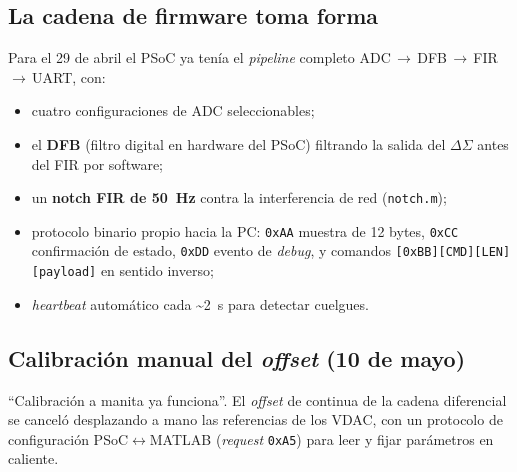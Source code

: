 \subsection{La cadena de firmware toma forma}

Para el 29 de abril el PSoC ya ten\'ia el \emph{pipeline} completo
ADC\,$\to$\,DFB\,$\to$\,FIR\,$\to$\,UART, con:

\begin{itemize}[itemsep=0.2em]
\item cuatro configuraciones de ADC seleccionables;
\item el \textbf{DFB} (filtro digital en hardware del PSoC) filtrando la salida
del $\Delta\Sigma$ antes del FIR por software;
\item un \textbf{notch FIR de \SI{50}{\hertz}} contra la interferencia de red
(\texttt{notch.m});
\item protocolo binario propio hacia la PC: \texttt{0xAA} muestra de 12 bytes,
\texttt{0xCC} confirmaci\'on de estado, \texttt{0xDD} evento de \emph{debug},
y comandos \texttt{[0xBB][CMD][LEN][payload]} en sentido inverso;
\item \emph{heartbeat} autom\'atico cada \textasciitilde{}\SI{2}{\second} para
detectar cuelgues.
\end{itemize}


\subsection{Calibraci\'on manual del \emph{offset} (10 de mayo)}

``Calibraci\'on a manita ya funciona''. El \emph{offset} de continua de la
cadena diferencial se cancel\'o desplazando a mano las referencias de los VDAC,
con un protocolo de configuraci\'on PSoC$\leftrightarrow$MATLAB
(\emph{request} \texttt{0xA5}) para leer y fijar par\'ametros en caliente.


